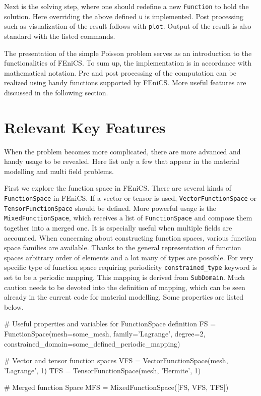Next is the solving step, where one should redefine a new \texttt{Function} to hold the solution. Here overriding the above defined \texttt{u} is implemented. Post processing such as visualization of the result follows with \texttt{plot}. Output of the result is also standard with the listed commands.

The presentation of the simple Poisson problem serves as an introduction to the functionalities of FEniCS. To sum up, the implementation is in accordance with mathematical notation. Pre and post processing of the computation can be realized using handy functions supported by FEniCS. More useful features are discussed in the following section.

\section{Relevant Key Features}
When the problem becomes more complicated, there are more advanced and handy usage to be revealed. Here list only a few that appear in the material modelling and multi field problems.

First we explore the function space in FEniCS. There are several kinds of \texttt{FunctionSpace} in FEniCS. If a vector or tensor is used, \texttt{VectorFunctionSpace} or \texttt{TensorFunctionSpace} should be defined. More powerful usage is the \texttt{MixedFunctionSpace}, which receives a list of \texttt{FunctionSpace} and compose them together into a merged one. It is especially useful when multiple fields are accounted. When concerning about constructing function spaces, various function space families are available. Thanks to the general representation of function spaces arbitrary order of elements and a lot many of types are possible. For very specific type of function space requiring periodicity \texttt{constrained\_type} keyword is set to be a periodic mapping. This mapping is derived from \texttt{SubDomain}. Much caution needs to be devoted into the definition of mapping, which can be seen already in the current code for material modelling. Some properties are listed below.

\begin{python}
# Useful properties and variables for FunctionSpace definition
FS = FunctionSpace(mesh=some_mesh, family='Lagrange', degree=2, constrained_domain=some_defined_periodic_mapping)

# Vector and tensor function spaces
VFS = VectorFunctionSpace(mesh, 'Lagrange', 1)
TFS = TensorFunctionSpace(mesh, 'Hermite', 1)

# Merged function Space
MFS = MixedFunctionSpace([FS, VFS, TFS])
\end{python}

